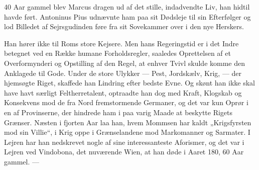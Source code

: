 \documentclass[12pt,a4paper,openany]{book}
\newcommand{\opage}[1]{\marginnote{\footnotesize\textit{[#1]}}}
\begin{document}
\setcounter{footnote}{0}%
\opage{110}40 Aar gammel blev Marcus dragen ud af det stille, indadvendte
Liv, han hidtil havde ført. Antoninus Pius udnævnte
ham paa sit Dødsleje til sin Efterfølger og lod Billedet af
Sejrsgudinden føre fra sit Sovekammer over i den nye Herskers.


Han hører ikke til Roms store Kejsere. Men hans Regeringstid
er i det Indre betegnet ved en Række humane Forholdsregler,
saaledes Oprettelsen af et Overformynderi og Opstilling
af den Regel, at enhver Tvivl skulde komme den Anklagede
til Gode. Under de store Ulykker --- Pest, Jordskælv,
Krig, --- der hjemsøgte Riget, skaffede han Lindring efter bedste
Evne. Og skønt han ikke skal have havt særligt Feltherretalent,
optraadte han dog med Kraft, Klogskab og Konsekvens
mod de fra Nord fremstormende Germaner, og det var kun
Oprør i en af Provinserne, der hindrede ham i paa varig
Maade at beskytte Rigets Grænser. Næsten i fjorten Aar laa
han, hvem Mommsen har kaldt „Krigsfyrsten mod sin Villie“,
i Krig oppe i Grænselandene mod Markomanner og Sarmater.
I Lejren har han nedskrevet nogle af sine interessanteste Aforismer,
og det var i Lejren ved Vindobona, det nuværende
Wien, at han døde i Aaret 180, 60 Aar gammel. ---
\end{document}
